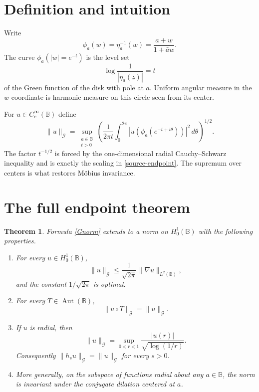 \documentclass[11pt]{article}
\newtheorem{theorem}{Theorem}
\newcommand{\B}{\mathbb B}
\newcommand{\G}{\mathcal G}
\newcommand{\Aut}{\operatorname{Aut}}
\begin{document}
\section{Definition and intuition}

Write
\[
 \phi_a(w)=\eta_a^{-1}(w)=\frac{a+w}{1+\bar a w}.
\]
The curve $\phi_a(|w|=e^{-t})$ is the level set
\[
 \log\frac1{|\eta_a(z)|}=t
\]
of the Green function of the disk with pole at $a$.  Uniform angular
measure in the $w$-coordinate is harmonic measure on this circle seen
from its center.

For $u\in C_c^\infty(\B)$ define
\begin{equation}\label{Gnorm}
 \boxed{\quad
 \|u\|_{\G}
 =
 \sup_{\substack{a\in\B\\ t>0}}
 \left(
 \frac1{2\pi t}\int_0^{2\pi}
 \left|u\!\left(\phi_a(e^{-t+i\theta})\right)\right|^2
 \,d\theta
 \right)^{1/2}.
 \quad}
\end{equation}
The factor $t^{-1/2}$ is forced by the one-dimensional radial
Cauchy--Schwarz inequality and is exactly the scaling in
\eqref{source-endpoint}.  The supremum over centers is what restores
M\"obius invariance.

\section{The full endpoint theorem}

\begin{theorem}\label{main}
Formula \eqref{Gnorm} extends to a norm on $H_0^1(\B)$ with the following
properties.
\begin{enumerate}
\item For every $u\in H_0^1(\B)$,
\begin{equation}\label{sharp-embedding}
 \|u\|_{\G}\le\frac1{\sqrt{2\pi}}\|\nabla u\|_{L^2(\B)},
\end{equation}
and the constant $1/\sqrt{2\pi}$ is optimal.
\item For every $T\in\Aut(\B)$,
\begin{equation}\label{mobius-invariance}
 \|u\circ T\|_{\G}=\|u\|_{\G}.
\end{equation}
\item If $u$ is radial, then
\begin{equation}\label{radial-identity}
 \|u\|_{\G}
 =\sup_{0<r<1}\frac{|u(r)|}{\sqrt{\log(1/r)}}.
\end{equation}
Consequently $\|h_su\|_{\G}=\|u\|_{\G}$ for every $s>0$.
\item More generally, on the subspace of functions radial about any
$a\in\B$, the norm is invariant under the conjugate dilation centered
at $a$.
\end{enumerate}
\end{theorem}
\end{document}
